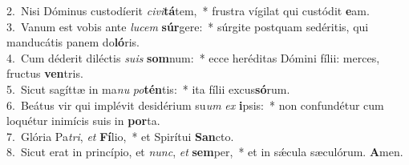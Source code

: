 {2.~}Nisi Dóminus custodíerit \textit{ci}\textit{vi}\textbf{tá}tem,~* frustra vígilat qui custódit \textbf{e}am.\\
{3.~}Vanum est vobis ante \textit{lu}\textit{cem} \textbf{súr}gere:~* súrgite postquam sedéritis, qui manducátis panem do\textbf{ló}ris.\\
{4.~}Cum déderit diléctis \textit{su}\textit{is} \textbf{som}num:~* ecce heréditas Dómini fílii: merces, fructus \textbf{ven}tris.\\
{5.~}Sicut sagíttæ in ma\textit{nu} \textit{po}\textbf{tén}tis:~* ita fílii excus\textbf{só}rum.\\
{6.~}Beátus vir qui implévit desidérium su\textit{um} \textit{ex} \textbf{i}psis:~* non confundétur cum loquétur inimícis suis in \textbf{por}ta.\\
{7.~}Glória Pa\textit{tri}, \textit{et} \textbf{Fí}lio,~* et Spirítui \textbf{San}cto.\\
{8.~}Sicut erat in princípio, et \textit{nunc}, \textit{et} \textbf{sem}per,~* et in sǽcula sæculórum. \textbf{A}men.\\
